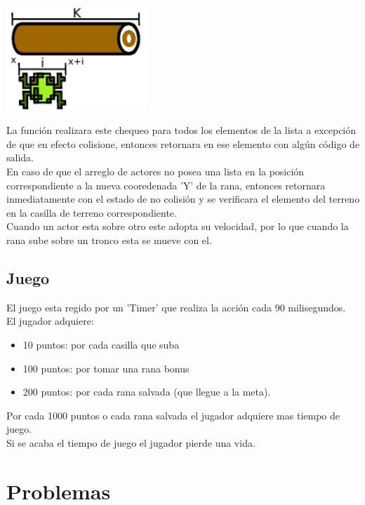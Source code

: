 \documentclass[letter, 12pt] {article}
\begin{document}
\begin {center}
  \includegraphics[width=200px]{./img/collision.pdf}\\[.5cm]
\end {center}
La función realizara este chequeo para todos los elementos de la
lista a excepción de que en efecto colisione, entonces retornara en
ese elemento con algún código de salida. \\

En caso de que el arreglo de actores no posea una lista en la 
posición correspondiente a la nueva cooredenada 'Y' de la rana, 
entonces retornara inmediatamente con el estado de no colisión
y se verificara el elemento del terreno en la casilla de terreno
correspondiente. \\

Cuando un actor esta sobre otro este adopta su velocidad, por lo
que cuando la rana sube sobre un tronco esta se mueve con el.

\newpage

\subsection* {Juego}
El juego esta regido por un 'Timer' que realiza la acción cada 90
milisegundos.\\

El jugador adquiere: 
\begin {itemize}
  \item 10 puntos: por cada casilla que suba
  \item 100 puntos: por tomar una rana bonus
  \item 200 puntos: por cada rana salvada (que llegue a la meta).
\end {itemize}

Por cada 1000 puntos o cada rana salvada el jugador adquiere mas 
tiempo de juego. \\

Si se acaba el tiempo de juego el jugador pierde una vida. \\

\section* {Problemas}
\end{document}
